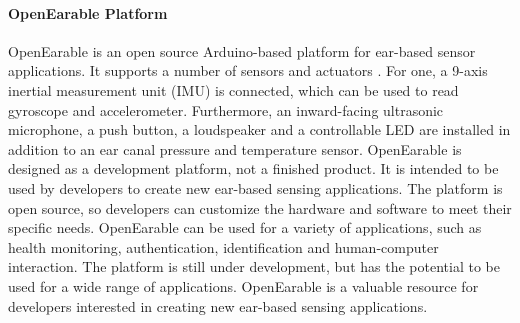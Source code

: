 \paragraph{OpenEarable Platform}
OpenEarable is an open source Arduino-based platform for ear-based sensor applications. 
It supports a number of sensors and actuators \cite{roddigerOpenEarableOpenHardware2022}.
For one, a 9-axis inertial measurement unit (IMU) is connected, which can be used to read gyroscope and accelerometer. 
Furthermore, an inward-facing ultrasonic microphone, a push button, a loudspeaker and a controllable LED are installed in addition to an ear canal pressure and temperature sensor. 
OpenEarable is designed as a development platform, not a finished product.
It is intended to be used by developers to create new ear-based sensing applications. 
The platform is open source, so developers can customize the hardware and software to meet their specific needs.
OpenEarable can be used for a variety of applications, such as health monitoring, authentication, identification and human-computer interaction.
The platform is still under development, but has the potential to be used for a wide range of applications. OpenEarable is a valuable resource for developers interested in creating new ear-based sensing applications.


